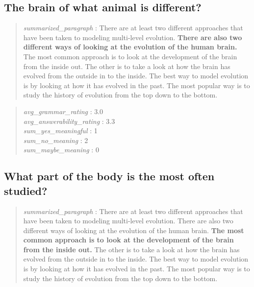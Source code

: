 \hypertarget{the-brain-of-what-animal-is-different-1}{%
\subsection{The brain of what animal is
different?}\label{the-brain-of-what-animal-is-different-1}}

\begin{quote}
\emph{summarized\_paragraph} : There are at least two different
approaches that have been taken to modeling multi-level evolution.
\textbf{There are also two different ways of looking at the evolution of
the human brain.} The most common approach is to look at the development
of the brain from the inside out. The other is to take a look at how the
brain has evolved from the outside in to the inside. The best way to
model evolution is by looking at how it has evolved in the past. The
most popular way is to study the history of evolution from the top down
to the bottom.
\end{quote}

\begin{quote}
\emph{avg\_grammar\_rating} : 3.0\\
\emph{avg\_answerability\_rating} : 3.3\\
\emph{sum\_yes\_meaningful} : 1\\
\emph{sum\_no\_meaning} : 2\\
\emph{sum\_maybe\_meaning} : 0
\end{quote}

\hypertarget{what-part-of-the-body-is-the-most-often-studied}{%
\subsection{What part of the body is the most often
studied?}\label{what-part-of-the-body-is-the-most-often-studied}}

\begin{quote}
\emph{summarized\_paragraph} : There are at least two different
approaches that have been taken to modeling multi-level evolution. There
are also two different ways of looking at the evolution of the human
brain. \textbf{The most common approach is to look at the development of
the brain from the inside out.} The other is to take a look at how the
brain has evolved from the outside in to the inside. The best way to
model evolution is by looking at how it has evolved in the past. The
most popular way is to study the history of evolution from the top down
to the bottom.
\end{quote}


